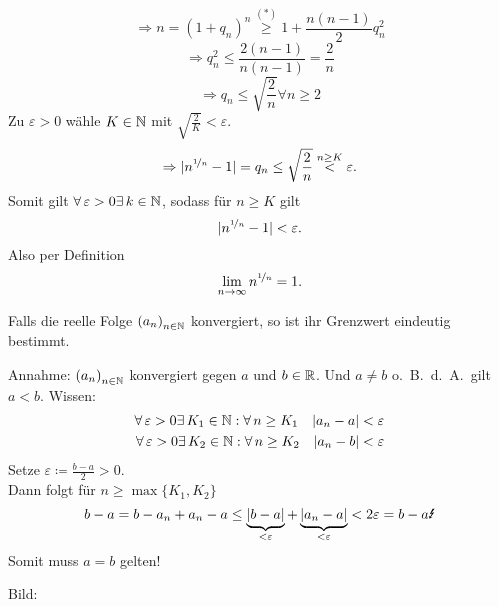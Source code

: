 \documentclass[../ana1.tex]{subfiles}
\begin{document}
\begin{bsp}
\begin{enumerate}
\begin{bew}
		\[\Rightarrow n = {(1+q_n)}^n \overset{(*)}{\geq}1+\frac{n(n-1)}{2} q_n^2\]
		\[\Rightarrow q_n^2 \leq \frac{2(n-1)}{n(n-1)} = \frac{2}{n}\]
		\[\Rightarrow q_n \leq \sqrt{\frac{2}{n}} \forall n\geq 2\]
		Zu \(\varepsilon >0\) wähle \(K\in\mathbb{N} \) mit \(\sqrt{\frac{2}{K}}<\varepsilon \).
		\[\Rightarrow |n^{\nicefrac{1}{n}} -1| = q_n \leq \sqrt{\frac{2}{n}} \overset{n\geq K}{<} \varepsilon.\]
		Somit gilt \(\forall\varepsilon>0\exists k\in\N \), sodass für \(n\geq K\) gilt
		\[|n^{\nicefrac{1}{n}} - 1| <\varepsilon.\]
		Also per Definition
		\[\lim\limits_{n\rightarrow\infty} n^{\nicefrac{1}{n}} = 1.\]
	\end{bew}
	\end{enumerate}
\end{bsp}

\begin{satz}
	Falls die reelle Folge \({(a_n)}_{n\in\mathbb{N}}\) konvergiert, so ist ihr Grenzwert eindeutig bestimmt.
\end{satz}
\begin{bew}
	Annahme: \({(a_n)}_{n\in\mathbb{N}}\) konvergiert gegen \(a\) und \(b\in\mathbb{R} \). Und \(a\neq b\) o.\ B.\ d.\ A.\ gilt \(a<b\).
	Wissen: 
	\begin{align*}
		\forall \varepsilon>0\exists K_1\in\N: \forall n\geq K_1 \quad |a_n -a| <\varepsilon \\
		\forall \varepsilon>0\exists K_2\in\N: \forall n\geq K_2 \quad |a_n -b| <\varepsilon
	\end{align*}
	Setze \(\varepsilon\coloneqq\frac{b-a}{2} >0\).\\
	Dann folgt für \(n\geq \max \{K_1,K_2\} \)
	\[b-a = b-a_n + a_n -a \leq \underbrace{|b-a|}_{<\varepsilon} + \underbrace{|a_n-a|}_{<\varepsilon} < 2\varepsilon = b-a \text{\Lightning}\]
	Somit muss \(a=b\) gelten!
\end{bew}

Bild:\\
\begin{center}
\end{center}
\end{document}
